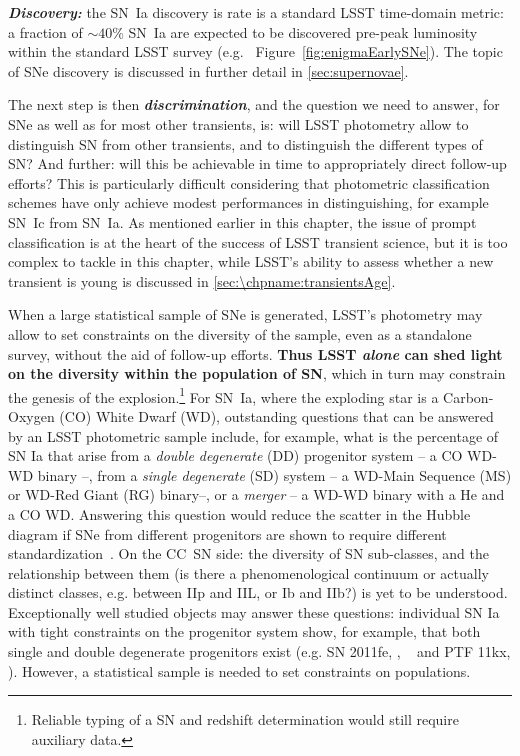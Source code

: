 {\bf \emph{Discovery:}} the SN~Ia discovery is rate is a standard LSST time-domain metric: a
fraction of $\sim40\%$ SN~Ia are expected to be discovered pre-peak
luminosity within the standard LSST survey
(e.g. ~Figure~\ref{fig:enigmaEarlySNe}). The
topic of SNe discovery is discussed in further detail in
\ref{sec:supernovae}.

The next step is then {\bf\emph{discrimination}}, and the question we need
to answer, for SNe as well as for most other transients, is: will LSST
photometry allow to distinguish SN from other transients, and to
distinguish the different types of SN? And further: will this be
achievable in time to appropriately direct follow-up efforts? This is
particularly difficult considering that photometric classification
schemes have only achieve modest performances in distinguishing, for
example SN~Ic from SN~Ia. As mentioned earlier in this chapter, the issue
of prompt classification is at the heart of the success of LSST
transient science, but it is too complex to tackle in this chapter,
while LSST's ability to assess whether a new transient is young is discussed
in \autoref{sec:\chpname:transientsAge}.

When a large statistical sample of SNe is generated, LSST's photometry
may allow to set constraints on the diversity of the sample, even as a
standalone survey, without the aid of follow-up efforts.  {\bf Thus
  LSST \emph{alone} can shed light on the diversity within the
  population of SN}, which in turn may constrain the genesis of the
explosion.\footnote{Reliable typing of a SN and redshift determination
  would still require auxiliary data.} For SN~Ia, where the exploding
star is a Carbon-Oxygen (CO) White Dwarf (WD), outstanding questions
that can be answered by an LSST photometric sample include, for
example, what is the percentage of SN Ia that arise from a
\emph{double degenerate} (DD) progenitor system -- a CO WD-WD binary
--, from a \emph {single degenerate} (SD) system -- a WD-Main Sequence
(MS) or WD-Red Giant (RG) binary--, or a \emph{merger} -- a WD-WD
binary with a He and a CO WD. Answering this question would reduce the
scatter in the Hubble diagram if SNe from different progenitors are
shown to require different standardization~\citep{Scolnic2014}. On the
CC~SN side: the diversity of SN sub-classes, and the relationship
between them (is there a phenomenological continuum or actually
distinct classes, e.g. between IIp and IIL, or Ib and IIb?) is yet to
be understood. Exceptionally well studied objects may answer these
questions: individual SN Ia with tight constraints on the progenitor
system show, for example, that both single and double degenerate
progenitors exist (e.g. SN 2011fe, \citealt{Li11}, ~\citealt{Olling15}
and PTF 11kx, \citealt{Dilday12}). However, a statistical sample is
needed to set constraints on populations.

